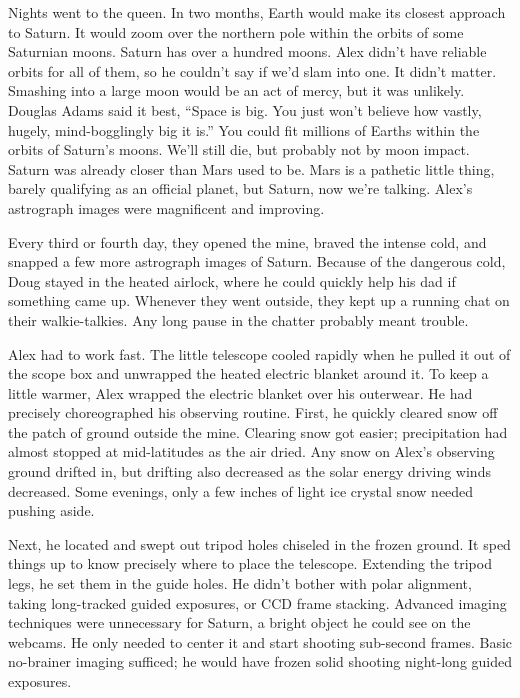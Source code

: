 Nights went to the queen. In two months, Earth would make its closest
approach to Saturn. It would zoom over the northern pole within the
orbits of some Saturnian moons. Saturn has over a hundred moons. Alex
didn't have reliable orbits for all of them, so he couldn't say if we'd
slam into one. It didn't matter. Smashing into a large moon would be an
act of mercy, but it was unlikely. Douglas Adams said it best, ``Space
is big. You just won't believe how vastly, hugely, mind-bogglingly big
it is.'' You could fit millions of Earths within the orbits of Saturn's
moons. We'll still die, but probably not by moon impact. Saturn was
already closer than Mars used to be. Mars is a pathetic little thing,
barely qualifying as an official planet, but Saturn, now we're talking.
Alex's astrograph images were magnificent and improving.

Every third or fourth day, they opened the mine, braved the intense
cold, and snapped a few more astrograph images of Saturn. Because of the
dangerous cold, Doug stayed in the heated airlock, where he could
quickly help his dad if something came up. Whenever they went outside,
they kept up a running chat on their walkie-talkies. Any long pause in
the chatter probably meant trouble.

Alex had to work fast. The little telescope cooled rapidly when he
pulled it out of the scope box and unwrapped the heated electric blanket
around it. To keep a little warmer, Alex wrapped the electric blanket
over his outerwear. He had precisely choreographed his observing
routine. First, he quickly cleared snow off the patch of ground outside
the mine. Clearing snow got easier; precipitation had almost stopped at
mid-latitudes as the air dried. Any snow on Alex's observing ground
drifted in, but drifting also decreased as the solar energy driving
winds decreased. Some evenings, only a few inches of light ice crystal
snow needed pushing aside.

Next, he located and swept out tripod holes chiseled in the frozen
ground. It sped things up to know precisely where to place the
telescope. Extending the tripod legs, he set them in the guide holes. He
didn't bother with polar alignment, taking long-tracked guided
exposures, or CCD frame stacking. Advanced imaging techniques were
unnecessary for Saturn, a bright object he could see on the webcams. He
only needed to center it and start shooting sub-second frames. Basic
no-brainer imaging sufficed; he would have frozen solid shooting
night-long guided exposures.

